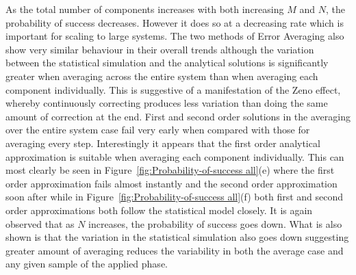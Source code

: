 \documentclass[aps,pra,twocolumn,superscriptaddress,numerical,floatfix]{revtex4-1}
\begin{document}
As the total number of components increases with both increasing $M$ and $N$, the probability of success decreases. However it does so at a decreasing rate which is important for scaling to large systems. The two methods of Error Averaging also show very similar behaviour in their overall trends although the variation between the statistical simulation and the analytical solutions is significantly greater when averaging across the entire system than when averaging each component individually. This is suggestive of a manifestation of the Zeno effect, whereby continuously correcting produces less variation than doing the same amount of correction at the end. First and second order solutions in the averaging over the entire system case fail very early when compared with those for averaging every step. Interestingly it appears that the first order analytical approximation is suitable when averaging each component individually. This can most clearly be seen in Figure~\ref{fig:Probability-of-success all}(e) where the first order approximation fails almost instantly and the second order approximation soon after while in Figure~\ref{fig:Probability-of-success all}(f) both first and second order approximations both follow the statistical model closely. It is again observed that as $N$ increases, the probability of success goes down. What is also shown is that the variation in the statistical simulation also goes down suggesting greater amount of averaging reduces the variability in both the average case and any given sample of the applied phase.
%
\end{document}
